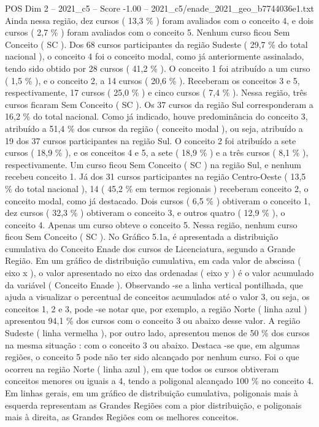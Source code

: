 \begin{textsample}{POS Dim 2 – 2021\_c5 – Score -1.00 – 2021\_c5/enade\_2021\_geo\_b7744036e1.txt}
Ainda nessa região, dez cursos ( 13,3 \% ) foram avaliados com o conceito 4, e dois cursos ( 2,7 \% ) foram avaliados com o conceito 5.
Nenhum curso ficou Sem Conceito ( SC ).
Dos 68 cursos participantes da região Sudeste ( 29,7 \% do total nacional ), o conceito 4 foi o conceito modal, como já anteriormente assinalado, tendo sido obtido por 28 cursos ( 41,2 \% ).
O conceito 1 foi atribuído a um curso ( 1,5 \% ), e o conceito 2, a 14 cursos ( 20,6 \% ).
Receberam os conceitos 3 e 5, respectivamente, 17 cursos ( 25,0 \% ) e cinco cursos ( 7,4 \% ).
Nessa região, três cursos ficaram Sem Conceito ( SC ).
Os 37 cursos da região Sul corresponderam a 16,2 \% do total nacional.
Como já indicado, houve predominância do conceito 3, atribuído a 51,4 \% dos cursos da região ( conceito modal ), ou seja, atribuído a 19 dos 37 cursos participantes na região Sul.
O conceito 2 foi atribuído a sete cursos ( 18,9 \% ), e os conceitos 4 e 5, a sete ( 18,9 \% ) e a três cursos ( 8,1 \% ), respectivamente.
Um curso ficou Sem Conceito ( SC ) na região Sul, e nenhum recebeu conceito 1.
Já dos 31 cursos participantes na região Centro-Oeste ( 13,5 \% do total nacional ), 14 ( 45,2 \% em termos regionais ) receberam conceito 2, o conceito modal, como já destacado.
Dois cursos ( 6,5 \% ) obtiveram o conceito 1, dez cursos ( 32,3 \% ) obtiveram o conceito 3, e outros quatro ( 12,9 \% ), o conceito 4.
Apenas um curso obteve o conceito 5.
Nessa região, nenhum curso ficou Sem Conceito ( SC ).
No Gráfico 5.1a, é apresentada a distribuição cumulativa do Conceito Enade dos cursos de Licenciatura, segundo a Grande Região.
Em um gráfico de distribuição cumulativa, em cada valor de abscissa ( eixo x ), o valor apresentado no eixo das ordenadas ( eixo y ) é o valor acumulado da variável ( Conceito Enade ).
Observando -se a linha vertical pontilhada, que ajuda a visualizar o percentual de conceitos acumulados até o valor 3, ou seja, os conceitos 1, 2 e 3, pode -se notar que, por exemplo, a região Norte ( linha azul ) apresentou 94,1 \% dos cursos com o conceito 3 ou abaixo desse valor.
A região Sudeste ( linha vermelha ), por outro lado, apresentou menos de 50 \% dos cursos na mesma situação : com o conceito 3 ou abaixo.
Destaca -se que, em algumas regiões, o conceito 5 pode não ter sido alcançado por nenhum curso.
Foi o que ocorreu na região Norte ( linha azul ), em que todos os cursos obtiveram conceitos menores ou iguais a 4, tendo a poligonal alcançado 100 \% no conceito 4.
Em linhas gerais, em um gráfico de distribuição cumulativa, poligonais mais à esquerda representam as Grandes Regiões com a pior distribuição, e poligonais mais à direita, as Grandes Regiões com os melhores conceitos.

\end{textsample}
